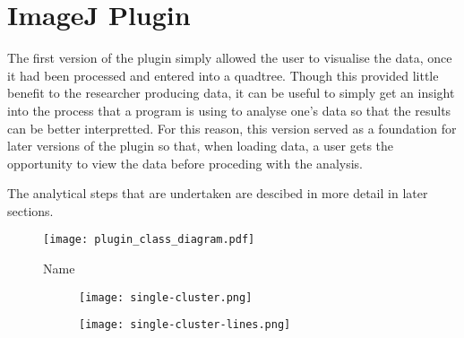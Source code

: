 
\section{ImageJ Plugin}
\label{sec:imagej_plugin}

The first version of the plugin simply allowed the user to visualise the data,
once it had been processed and entered into a quadtree. Though this provided
little benefit to the researcher producing data, it can be useful to simply get
an insight into the process that a program is using to analyse one's data so
that the results can be better interpretted. For this reason, this version
served as a foundation for later versions of the plugin so that, when loading
data, a user gets the opportunity to view the data before proceding with the
analysis.

The analytical steps that are undertaken are descibed in more detail in later
sections.

\begin{figure*}[tbhp]
	\centering
	\texttt{[image: plugin\_class\_diagram.pdf]}
	\caption{Name}
	\label{fig:name}
\end{figure*}

\begin{figure}[tbhp]
    \centering
    \begin{subfigure}[c]{0.48\linewidth}
        \texttt{[image: single-cluster.png]}
        \caption{}\label{fig:single-cluster-points}
    \end{subfigure}%
    \quad
    \begin{subfigure}[c]{0.48\linewidth}
        \texttt{[image: single-cluster-lines.png]}
        \caption{}\label{fig:single-cluster-lines}
    \end{subfigure}
    \caption{} \label{fig:single-cluster}
\end{figure}
